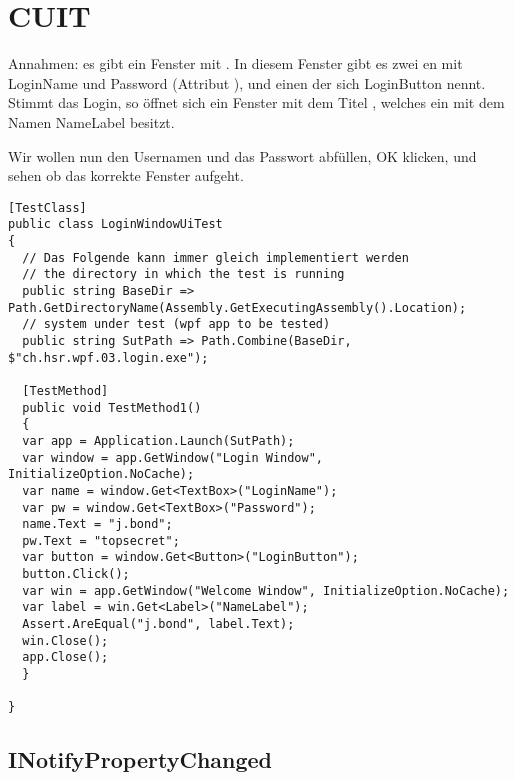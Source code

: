 \section{CUIT}
Annahmen: es gibt ein Fenster mit . In diesem Fenster gibt es zwei en mit LoginName und Password (Attribut ), und einen  der sich LoginButton nennt. Stimmt das Login, so öffnet sich ein Fenster mit dem Titel , welches ein  mit dem Namen NameLabel besitzt.

Wir wollen nun den Usernamen und das Passwort abfüllen, OK klicken, und sehen ob das korrekte Fenster aufgeht.

\begin{lstlisting}
[TestClass]
public class LoginWindowUiTest
{
  // Das Folgende kann immer gleich implementiert werden
  // the directory in which the test is running
  public string BaseDir => Path.GetDirectoryName(Assembly.GetExecutingAssembly().Location);
  // system under test (wpf app to be tested)
  public string SutPath => Path.Combine(BaseDir, $"ch.hsr.wpf.03.login.exe");
  
  [TestMethod]
  public void TestMethod1()
  {
  var app = Application.Launch(SutPath);
  var window = app.GetWindow("Login Window", InitializeOption.NoCache);
  var name = window.Get<TextBox>("LoginName");
  var pw = window.Get<TextBox>("Password");
  name.Text = "j.bond";
  pw.Text = "topsecret";
  var button = window.Get<Button>("LoginButton");
  button.Click();
  var win = app.GetWindow("Welcome Window", InitializeOption.NoCache);
  var label = win.Get<Label>("NameLabel");
  Assert.AreEqual("j.bond", label.Text);
  win.Close();
  app.Close();
  }
  
}
\end{lstlisting}

\subsection{INotifyPropertyChanged}

